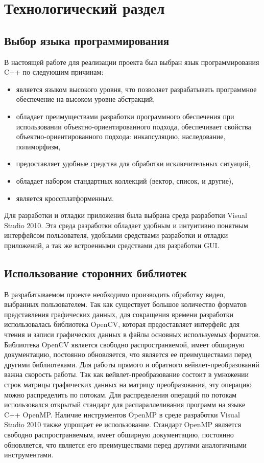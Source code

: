 \chapter{Технологический раздел}
\label{cha:impl}

\section{Выбор языка программирования}
В настоящей работе для реализации проекта был выбран язык программирования C++ по следующим причинам:
\begin{itemize}
 \item является языком высокого уровня, что позволяет разрабатывать программное обеспечение на высоком уровне абстракций,
 \item обладает преимуществами разработки программного обеспечения при использовании объектно-ориентированного подхода, обеспечивает 
 свойства объектно-ориентированного подхода: инкапсуляцию, наследование, полиморфизм,
 \item предоставляет удобные средства для обработки исключительных ситуаций,
 \item обладает набором стандартных коллекций (вектор, список, и другие),
 \item является кроссплатформенным.
\end{itemize}

Для разработки и отладки приложения была выбрана среда разработки Visual Studio 2010. 
Эта среда разработки обладает удобным и интуитивно понятным интерфейсом 
пользователя, удобными средствами разработки и отладки приложений, 
а так же встроенными средствами для разработки GUI.

\section{Использование сторонних библиотек}
В разрабатываемом проекте необходимо производить обработку видео, выбранных пользователем. 
Так как существует большое количество форматов представления графических данных, для сокращения 
времени разработки использовалась библиотека OpenCV, которая предоставляет интерфейс для чтения 
и записи графических данных в файлы основных используемых форматов. Библиотека OpenCV является 
свободно распространяемой, имеет обширную документацию, постоянно обновляется, 
что является ее преимуществами перед другими библиотеками.
Для работы прямого и обратного вейвлет-преобразований важна скорость работы. 
Так как вейвлет-преобразование состоит в умножении строк матрицы графических данных 
на матрицу преобразования, эту операцию можно распределить по потокам. 
Для распределения операций по потокам использовался открытый стандарт для распараллеливания программ на 
языке C++ OpenMP. Наличие инструментов 
OpenMP в среде разработки Visual Studio 2010 также упрощает ее использование.  
Стандарт OpenMP является свободно распространяемым, имеет обширную документацию, 
постоянно обновляется, что является его преимуществами перед другими аналогичными инструментами.


